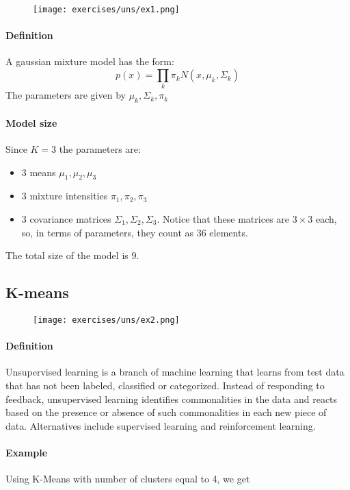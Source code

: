 \begin{figure}[H]
    \centering
    \texttt{[image: exercises/uns/ex1.png]}
\end{figure}

\paragraph{Definition}
A gaussian mixture model has the form:
$$p(x)=\prod_k \pi_k N(x,\mu_k,\Sigma_k)$$
The parameters are given by $\mu_k, \Sigma_k, \pi_k$

\paragraph{Model size }
Since $K=3$ the parameters are: 
\begin{itemize}
\item 3 means $\mu_1,\mu_2,\mu_3$ 
\item 3 mixture intensities $\pi_1,\pi_2,\pi_3$ 
\item 3 covariance matrices $\Sigma_1,\Sigma_2,\Sigma_3$. Notice that these matrices are $3\times 3$ each, so, in terms of parameters, they count as $36$ elements.
\end{itemize}
The total size of the model is $9$.


\subsection{K-means}

\begin{figure}[H]
    \centering
    \texttt{[image: exercises/uns/ex2.png]}
\end{figure}


\paragraph{Definition}
Unsupervised learning is a branch of machine learning that learns from test data that has not been labeled, classified or categorized. Instead of responding to feedback, unsupervised learning identifies commonalities in the data and reacts based on the presence or absence of such commonalities in each new piece of data. Alternatives include supervised learning and reinforcement learning. 

\paragraph{Example}
Using K-Means with number of clusters equal to 4, we get 


